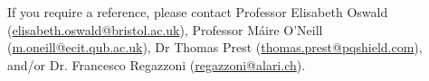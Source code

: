 \documentclass[10pt,a4paper]{moderncv}
\begin{document}
If you require a reference, please contact Professor Elisabeth Oswald (\url{elisabeth.oswald@bristol.ac.uk}), Professor M\'{a}ire O'Neill (\url{m.oneill@ecit.qub.ac.uk}), Dr Thomas Prest (\url{thomas.prest@pqshield.com}), and/or Dr. Francesco Regazzoni (\url{regazzoni@alari.ch}). %




%

\end{document}
